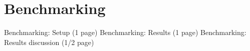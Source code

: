 \section{Benchmarking}


Benchmarking: Setup (1 page)
Benchmarking: Results (1 page)
Benchmarking: Results discussion (1/2 page)
